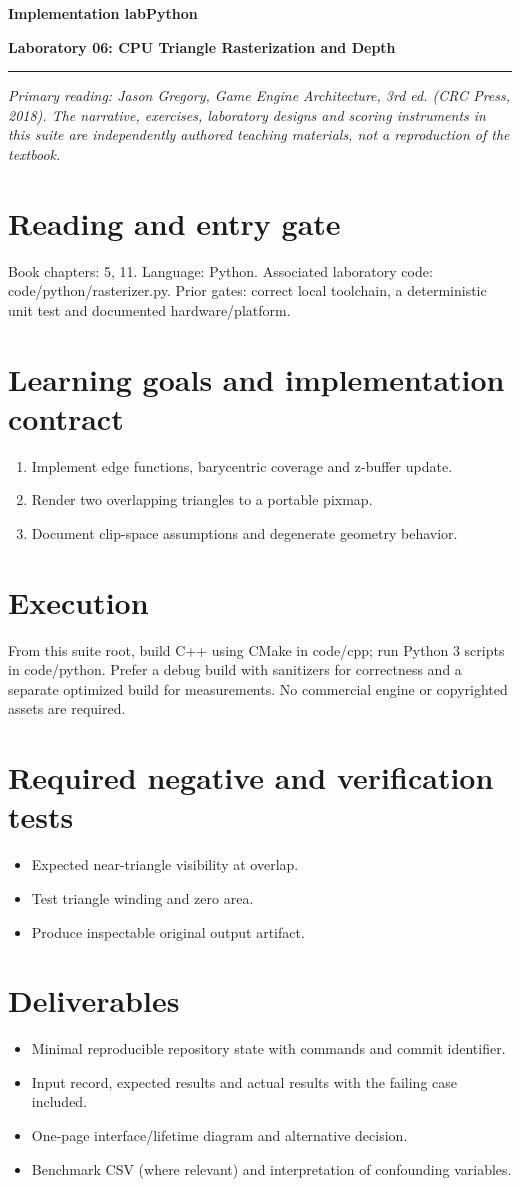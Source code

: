\documentclass[11pt,letterpaper]{article}
\newcommand{\DocType}{Reference}
\newcommand{\SuiteHeading}[3]{%
\renewcommand{\DocType}{#2}%
{\small\bfseries\sffamily\color{EngineTeal}#2\hfill #3}\par\vspace{6pt}
{\LARGE\bfseries\color{EngineBlue}#1}\par\vspace{4pt}
{\color{EngineTeal}\rule{\linewidth}{1pt}}\par\vspace{7pt}}
\newcommand{\SourceNote}{\footnotesize\textit{Primary reading: Jason Gregory, \emph{Game Engine Architecture}, 3rd ed. (CRC Press, 2018). The narrative, exercises, laboratory designs and scoring instruments in this suite are independently authored teaching materials, not a reproduction of the textbook.}\normalsize\par}
\begin{document}
\SuiteHeading{Laboratory 06: CPU Triangle Rasterization and Depth}{Implementation lab}{Python}
\SourceNote
\section{Reading and entry gate}
Book chapters: 5, 11. Language: Python. Associated laboratory code: code/python/rasterizer.py. Prior gates: correct local toolchain, a deterministic unit test and documented hardware/platform.

\section{Learning goals and implementation contract}
\begin{enumerate}
\item Implement edge functions, barycentric coverage and z-buffer update.
\item Render two overlapping triangles to a portable pixmap.
\item Document clip-space assumptions and degenerate geometry behavior.
\end{enumerate}
\section{Execution}
From this suite root, build C++ using CMake in code/cpp; run Python 3 scripts in code/python. Prefer a debug build with sanitizers for correctness and a separate optimized build for measurements. No commercial engine or copyrighted assets are required.

\section{Required negative and verification tests}
\begin{itemize}
\item Expected near-triangle visibility at overlap.
\item Test triangle winding and zero area.
\item Produce inspectable original output artifact.
\end{itemize}
\section{Deliverables}
\begin{itemize}
\item Minimal reproducible repository state with commands and commit identifier.
\item Input record, expected results and actual results with the failing case included.
\item One-page interface/lifetime diagram and alternative decision.
\item Benchmark CSV (where relevant) and interpretation of confounding variables.
\end{itemize}
\end{document}

